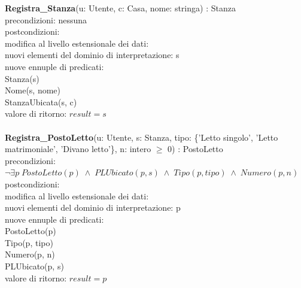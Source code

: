 \documentclass[a4paper,12pt]{report}
\begin{document}
        \hspace*{-1cm}
        \textbf{Registra\_Stanza}(u: Utente, c: Casa, nome: stringa) : Stanza \\
        \hspace*{1cm} precondizioni: nessuna \\
        \hspace*{1cm} postcondizioni: \\
        \hspace*{2cm} modifica al livello estensionale dei dati: \\
        \hspace*{3cm} nuovi elementi del dominio di interpretazione: s \\
        \hspace*{3cm} nuove ennuple di predicati: \\
        \hspace*{4cm} Stanza(s) \\
        \hspace*{4cm} Nome(s, nome) \\
        \hspace*{4cm} StanzaUbicata(s, c) \\
        \hspace*{2cm} valore di ritorno: $result = s$ \\ \\

        \hspace*{-1cm}
        \textbf{Registra\_PostoLetto}(u: Utente, s: Stanza, tipo: \{'Letto singolo', 'Letto matrimoniale', 'Divano letto'\}, n: intero $\geq$ 0) : PostoLetto \\
        \hspace*{1cm} precondizioni: $\neg \exists p \; PostoLetto(p) \; \wedge \; PLUbicato(p, s) \; \wedge \; Tipo(p, tipo) \; \wedge \; Numero(p, n)$ \\
        \hspace*{1cm} postcondizioni: \\
        \hspace*{2cm} modifica al livello estensionale dei dati: \\
        \hspace*{3cm} nuovi elementi del dominio di interpretazione: p \\
        \hspace*{3cm} nuove ennuple di predicati: \\
        \hspace*{4cm} PostoLetto(p) \\
        \hspace*{4cm} Tipo(p, tipo) \\
        \hspace*{4cm} Numero(p, n) \\
        \hspace*{4cm} PLUbicato(p, s) \\
        \hspace*{2cm} valore di ritorno: $result = p$ \\ \\
\end{document}
